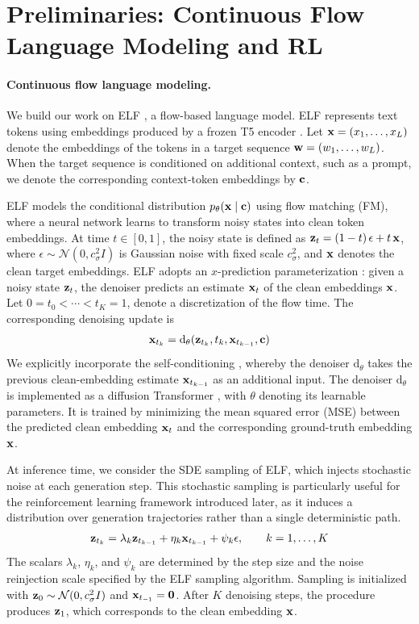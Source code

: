 \section{Preliminaries: Continuous Flow Language Modeling and RL}
\label{sec:prelim}

\paragraph{Continuous flow language modeling.}
We build our work on ELF \citep{hu2026elf}, a flow-based language model. ELF represents text tokens using embeddings produced by a frozen T5 encoder \citep{raffel2020t5}. Let ${\mathbf{x}}=(x_1,\ldots,x_L)$ denote the embeddings of the tokens in a target sequence ${\mathbf{w}}=(w_1,\ldots,w_L)$. When the target sequence is conditioned on additional context, such as a prompt, we denote the corresponding context-token embeddings by ${\mathbf{c}}$. 

ELF models the conditional distribution $p_\theta({\mathbf{x}} \mid {\mathbf{c}})$ using flow matching (FM), where a neural network learns to transform noisy states into clean token embeddings. At time $t\in[0,1]$, the noisy state is defined as ${\mathbf{z}}_t=(1-t)\,\epsilon+t\,{\mathbf{x}}$, where $\epsilon\sim\mathcal N(0, c_\sigma^2I)$ is Gaussian noise with fixed scale $c_\sigma^2$, and ${\mathbf{x}}$ denotes the clean target embeddings. ELF adopts an $x$-prediction parameterization \citep{li2026back, han2026self}: given a noisy state ${\mathbf{z}}_t$, the denoiser predicts an estimate ${\mathbf{x}}_t$ of the clean embeddings ${\mathbf{x}}$. Let $0=t_0<\cdots<t_K=1$, denote a discretization of the flow time. The corresponding denoising update is
\begin{align} 
{\mathbf{x}}_{t_{k}} = \mathrm{d}_\theta({\mathbf{z}}_{t_{k}}, t_{k}, {\mathbf{x}}_{t_{k-1}}, {\mathbf{c}})
\label{eq:denoiser}
\end{align} 
We explicitly incorporate the self-conditioning \citep{chen2022analog}, whereby the denoiser $\mathrm{d}_\theta$ takes the previous clean-embedding estimate ${\mathbf{x}}_{t_{k-1}}$ as an additional input. The denoiser $\mathrm{d}_\theta$ is implemented as a diffusion Transformer \citep{peebles2023scalable}, with $\theta$ denoting its learnable parameters. It is trained by minimizing the mean squared error (MSE) between the predicted clean embedding ${\mathbf{x}}_t$ and the corresponding ground-truth embedding ${\mathbf{x}}$.

At inference time, we consider the SDE sampling of ELF, which injects stochastic noise at each generation step. This stochastic sampling is particularly useful for the reinforcement learning framework introduced later, as it induces a distribution over generation trajectories rather than a single deterministic path.
\begin{align} 
{\mathbf{z}}_{t_k} =  \lambda_k  {\mathbf{z}}_{t_{k-1}} + \eta_k {\mathbf{x}}_{t_{k-1}} + \psi_k \epsilon, \qquad k=1, \ldots, K  
\label{eq:sde}
\end{align} 
The scalars $\lambda_k$, $\eta_k$, and $\psi_k$ are determined by the step size and the noise reinjection scale specified by the ELF sampling algorithm. Sampling is initialized with ${\mathbf{z}}_0 \sim \mathcal{N}(0,c_\sigma^2 I)$ and ${\mathbf{x}}_{t_{-1}}=\mathbf{0}$. After $K$ denoising steps, the procedure produces ${\mathbf{z}}_1$, which corresponds  to the clean embedding ${\mathbf{x}}$.

